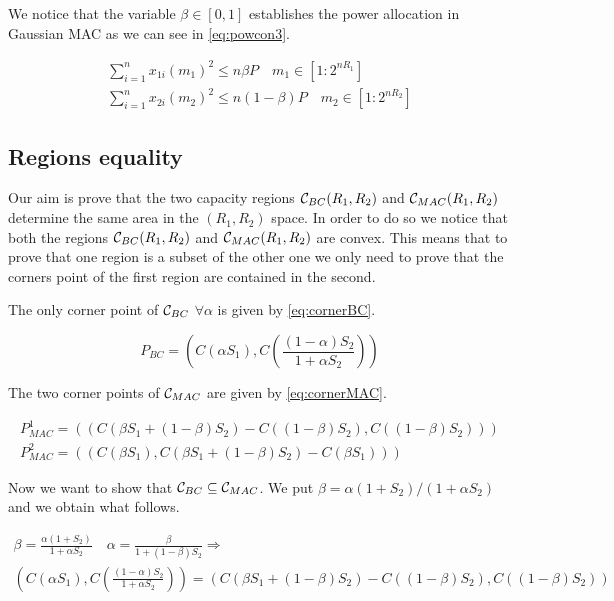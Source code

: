 We notice that the variable $\beta \in [0,1]$ establishes the power allocation in Gaussian MAC as we can see in \eqref{eq:powcon3}.

\begin{equation}
	\begin{gathered}
		\sum_{i=1}^n x_{1i}(m_1)^2 \leq n \beta P \quad m_1 \in [1:2^{nR_1}]\\
		\sum_{i=1}^n x_{2i}(m_2)^2 \leq n (1- \beta ) P \quad m_2 \in [1:2^{nR_2}]
	\end{gathered}
	\label{eq:powcon3}
\end{equation}

\subsection{Regions equality}

Our aim is prove that the two capacity regions $\mathcal{C}_{BC}(R_1, R_2)$ and $\mathcal{C}_{MAC}(R_1, R_2)$ determine the same area in the $(R_1, R_2)$ space. In order to do so we notice that both the regions $\mathcal{C}_{BC}(R_1, R_2)$ and $\mathcal{C}_{MAC}(R_1, R_2)$ are convex. This means that to prove that one region is a subset of the other one we only need to prove that the corners point of the first region are contained in the second.

The only corner point of $\mathcal{C}_{BC}$ $\forall \alpha $ is given by \eqref{eq:cornerBC}.

\begin{equation}
	P_{BC} = \left( C(\alpha S_1) , C \left( \frac{(1-\alpha)S_2}{1+\alpha S_2} \right) \right)
	\label{eq:cornerBC}
\end{equation}

The two corner points of $\mathcal{C}_{MAC}$ are given by \eqref{eq:cornerMAC}.

\begin{equation}
	\begin{gathered}
		P_{MAC}^1 = (\left( C (\beta S_1 + (1-\beta)S_2) - C((1-\beta)S_2) , C \left( (1-\beta)S_2 \right) \right)) \\ P_{MAC}^2 = (\left(C \left(\beta S_1 \right), C (\beta S_1 + (1-\beta)S_2) - C(\beta S_1) \right))
	\end{gathered}
	\label{eq:cornerMAC}
\end{equation}

Now we want to show that $\mathcal{C}_{BC} \subseteq \mathcal{C}_{MAC}$. We put $\beta = \alpha(1+S_2)/(1+\alpha S_2)$ and we obtain what follows.

\begin{gather*}
	\beta = \frac{\alpha(1+S_2)}{1+\alpha S_2} \quad  \alpha = \frac{\beta}{1+ (1-\beta) S_2} \Rightarrow \\
	\left( C(\alpha S_1) , C \left( \frac{(1-\alpha)S_2}{1+\alpha S_2} \right) \right) = \left( C (\beta S_1 + (1-\beta)S_2) - C((1-\beta)S_2) , C \left( (1-\beta)S_2 \right) \right)
\end{gather*}

